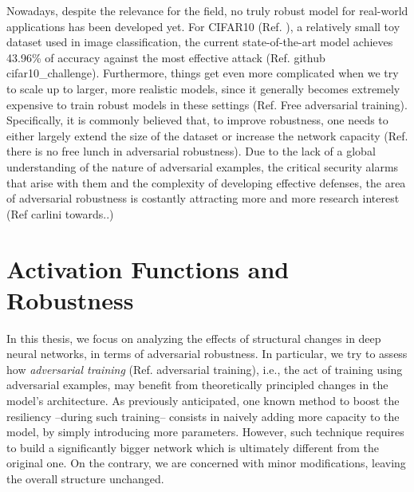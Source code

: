 \documentclass[LaM,binding=0.6cm]{./packages/sapthesis/sapthesis}
\begin{document}
        Nowadays, despite the relevance for the field, no truly robust model for real-world applications has been developed yet. For CIFAR10 (Ref. ), a relatively small toy dataset used in image classification, 
        the current state-of-the-art model achieves 43.96\% of accuracy against the most effective attack (Ref. github cifar10\_challenge).
        Furthermore, things get even more complicated when we try to scale up to larger, more realistic models, since it generally becomes extremely expensive to train robust models in these settings (Ref. Free adversarial training).
        Specifically, it is commonly believed that, to improve robustness, one needs to either largely extend the size of the dataset or increase the network capacity (Ref. there is no free lunch in adversarial robustness).
        Due to the lack of a global understanding of the nature of adversarial examples, the critical security alarms that arise with them and the complexity of developing effective defenses,
        the area of adversarial robustness is costantly attracting more and more research interest (Ref carlini towards..)



    \section{Activation Functions and Robustness}

        In this thesis, we focus on analyzing the effects of structural changes in deep neural networks, in terms of adversarial robustness.
        In particular, we try to assess how \textit{adversarial training} (Ref. adversarial training), i.e., the act of training using adversarial examples,
        may benefit from theoretically principled changes in the model's architecture.
        As previously anticipated, one known method to boost the resiliency --during such training-- consists in naively adding more capacity to the model, by simply 
        introducing more parameters.  
        However, such technique requires to build a significantly bigger network which is ultimately different from the original one. On the contrary, we are concerned with 
        minor modifications, leaving the overall structure unchanged.
\end{document}

